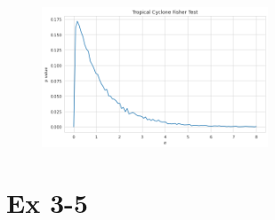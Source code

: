 \documentclass[11pt, letterpaper]{article}
\begin{document}
\begin{figure}[!h]
  \centering
  \includegraphics[width=0.6\textwidth]{hw6-1.png}
  \captionsetup{justification=centering}
\end{figure}

\section{Ex 3-5}
\end{document}

